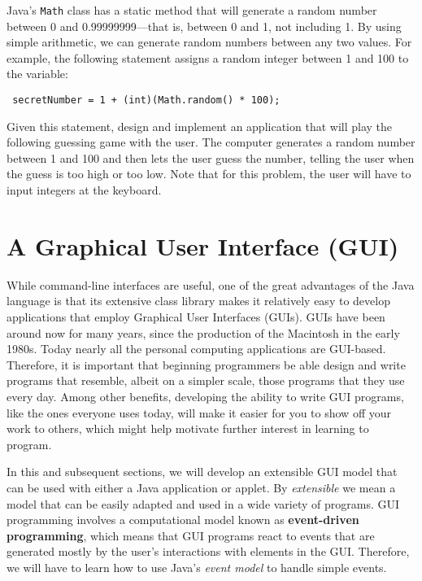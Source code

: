\begin{SSTUDY}
\item  Java's {\tt Math} class has a static method that will
generate a random number between 0 and 0.99999999---that is, 
between 0 and 1, not including 1. By using simple arithmetic,
we can generate random numbers between any two values. For example,
the following statement assigns a random integer between 1 and 100
to the variable:

\begin{jjjlisting}
\begin{lstlisting}
 secretNumber = 1 + (int)(Math.random() * 100);
\end{lstlisting}
\end{jjjlisting}

\indent Given this statement, design and implement an application that will 
play the following guessing game with the user. The computer generates
a random number between 1 and 100 and then lets the user guess the
number, telling the user when the guess is too high or too low. Note
that for this problem, the user will have to input integers at the
keyboard.

\end{SSTUDY}

\section{A Graphical User Interface (GUI)}

While command-line interfaces are useful, one of the great advantages
of the Java language is that its extensive class library makes it
relatively easy to develop applications that employ Graphical User
Interfaces (GUIs).  GUIs have been around now for many years, since
the production of the Macintosh in the early 1980s. Today nearly all
the personal computing applications are GUI-based.  Therefore, it is
important that beginning programmers be able design and write programs
that resemble, albeit on a simpler scale, those programs that they use
every day. Among other benefits, developing the ability to write GUI
programs, like the ones everyone uses today, will make it easier for
you to show off your work to others, which might help motivate further
interest in learning to program.

In this and subsequent sections, we will develop an extensible GUI
model that can be used with either a Java application or applet.  By
{\em extensible} we mean a model that can be easily adapted and used
in a wide variety of programs.  GUI programming involves a
computational model known as {\bf event-driven programming}, which
means that GUI programs react to events that are generated mostly by
the user's interactions with elements in the GUI. Therefore, we will
have to learn how to use Java's {\em event model} to handle simple
events.

